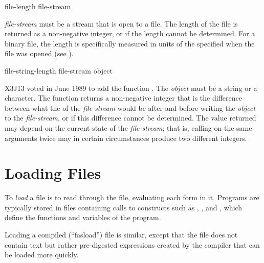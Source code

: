 \begin{defun}[Function]
file-length file-stream

\emph{file-stream} must be a stream that is open to a file.
The length of the file is returned as a non-negative integer,
or {\false} if the length cannot be determined.
For a binary file,
the length is specifically
measured in units of the  specified
when the file was opened (see ).
\end{defun}


\begin{newer}
\begin{defun}[Function]
file-string-length file-stream object

X3J13 voted in June 1989  to add
the function .
The \emph{object} must be a string or a character.  The function
 returns a non-negative integer
that is the difference between what the  of the
\emph{file-stream} would be after and before writing the \emph{object}
to the \emph{file-stream}, or  if this
difference cannot be determined.  The value returned may
depend on the current state of the \emph{file-stream}; that is, calling
 on the same arguments twice may in certain circumstances
produce two different integers.
\end{defun}
\end{newer}

\section{Loading Files}

To \emph{load} a file is to read through the file, evaluating each form in
it.  Programs are typically stored in files containing calls to
constructs such as , ,
and , which define
the functions and variables of the program.

Loading a compiled (``fasload'') file is similar, except that the file does not
contain text but rather pre-digested expressions created by the
compiler that can be loaded more quickly.

